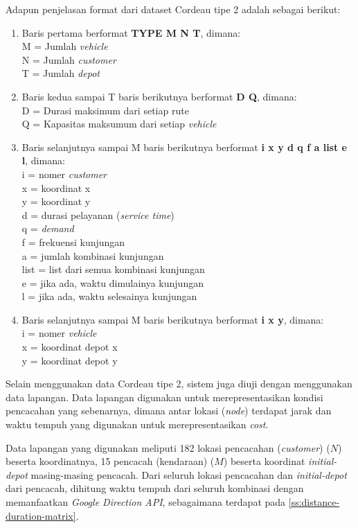 Adapun penjelasan format dari dataset Cordeau tipe 2 adalah sebagai berikut:
\begin{enumerate}
\item Baris pertama berformat \textbf{TYPE M N T}, dimana: \\
M = Jumlah \textit{vehicle} \\
N = Jumlah \textit{customer} \\
T = Jumlah \textit{depot}

\item Baris kedua sampai T baris berikutnya berformat \textbf{D Q}, dimana: \\
D = Durasi maksimum dari setiap rute \\
Q = Kapasitas maksumum dari setiap \textit{vehicle}

\item Baris selanjutnya sampai M baris berikutnya berformat \textbf{i x y d q f a list e l}, dimana: \\
i	= nomer \textit{customer} \\
x	= koordinat x \\
y	= koordinat y \\
d	= durasi pelayanan (\textit{service time}) \\
q	= \textit{demand} \\
f	= frekuensi kunjungan \\
a	= jumlah kombinasi kunjungan \\
list	= list dari semua kombinasi kunjungan \\
e	= jika ada, waktu dimulainya kunjungan \\
l	= jika ada, waktu selesainya kunjungan

\item Baris selanjutnya sampai M baris berikutnya berformat \textbf{i x y}, dimana: \\
i	= nomer \textit{vehicle} \\
x	= koordinat depot x \\
y	= koordinat depot y \\
\end{enumerate}


Selain menggunakan data Cordeau tipe 2, sistem juga diuji dengan menggunakan data lapangan. Data lapangan digunakan untuk merepresentasikan kondisi pencacahan yang sebenarnya, dimana antar lokasi (\textit{node}) terdapat jarak dan waktu tempuh yang digunakan untuk merepresentasikan \textit{cost}.

Data lapangan yang digunakan meliputi 182 lokasi pencacahan (\textit{customer}) ($N$) beserta koordinatnya, 15 pencacah (kendaraan) ($M$) beserta koordinat \textit{initial-depot} masing-masing pencacah. Dari seluruh lokasi pencacahan dan \textit{initial-depot} dari pencacah, dihitung waktu tempuh dari seluruh kombinasi dengan memanfaatkan \textit{Google Direction API}, sebagaimana terdapat pada  \autoref{ss:distance-duration-matrix}.


